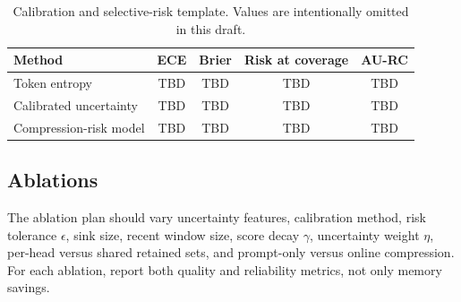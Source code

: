 \begin{table}[h]
\centering
\caption{Calibration and selective-risk template. Values are intentionally omitted in this draft.}
\begin{tabular}{lcccc}
\toprule
Method & ECE & Brier & Risk at coverage & AU-RC \\
\midrule
Token entropy & TBD & TBD & TBD & TBD \\
Calibrated uncertainty & TBD & TBD & TBD & TBD \\
Compression-risk model & TBD & TBD & TBD & TBD \\
\bottomrule
\end{tabular}
\end{table}

\subsection{Ablations}

The ablation plan should vary uncertainty features, calibration method, risk tolerance $\epsilon$, sink size, recent window size, score decay $\gamma$, uncertainty weight $\eta$, per-head versus shared retained sets, and prompt-only versus online compression. For each ablation, report both quality and reliability metrics, not only memory savings.
